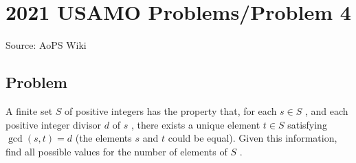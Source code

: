 \documentclass[12pt]{article}
\begin{document}
\section*{{2021 USAMO Problems/Problem 4}}
Source: AoPS Wiki

\subsection*{Problem}
A finite set $S$ of positive integers has the property that, for each $s\in S$ , and each positive integer divisor $d$ of $s$ , there exists a unique element $t \in S$ satisfying $\gcd(s,t)=d$ (the elements $s$ and $t$ could be equal). Given this information, find all possible values for the number of elements of $S$ .
\end{document}
